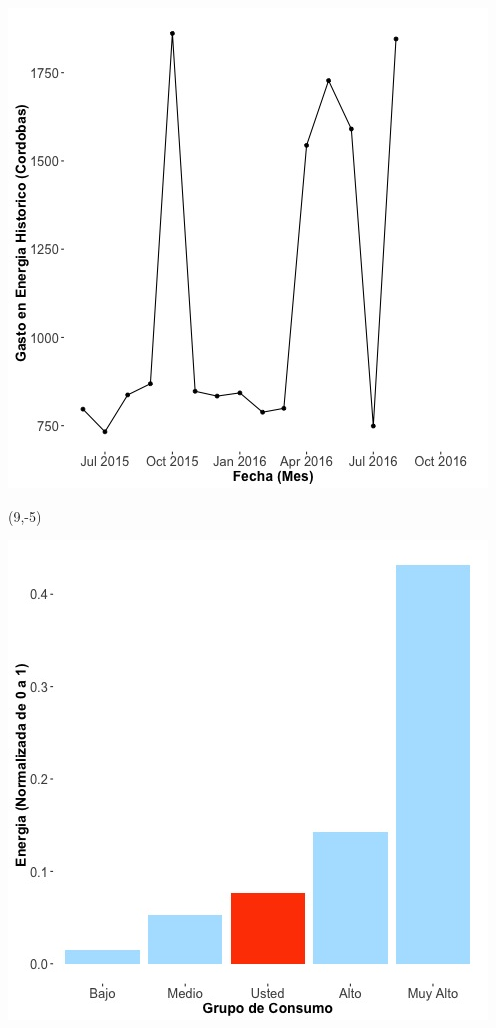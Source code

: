 \documentclass{article}\usepackage[]{graphicx}\usepackage[]{color}
\newenvironment{knitrout}{}{} %
\begin{document}
\begin{knitrout}
\color{fgcolor}
\includegraphics[scale=0.65]{figure/A6_historico_cordobas} 
\end{knitrout}

\begin{textblock}{1}(9,-5)
\begin{minipage}{20em}
\begingroup

\endgroup
\end{minipage}
\end{textblock}

\begin{knitrout}
\color{fgcolor}
\includegraphics[scale=0.65]{figure/A6_neighbor_plot} 
\end{knitrout}
\end{document}
